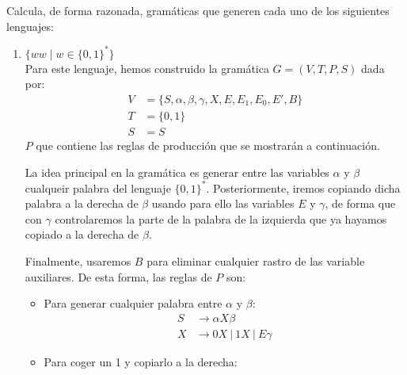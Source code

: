 \begin{ejercicio}
    Calcula, de forma razonada, gramáticas que generen cada uno de los siguientes lenguajes:
    \begin{enumerate}
        \item $\{ww \mid w \in \{0,1\}^\ast\}$\\
            Para este lenguaje, hemos construido la gramática $G=(V,T,P,S)$ dada por:
            \begin{align*}
                V &= \{S, \alpha, \beta, \gamma, X, E, E_1, E_0, E', B\} \\
                T &= \{0,1\} \\
                S &= S
            \end{align*}
            $P$ que contiene las reglas de producción que se mostrarán a continuación. 

            La idea principal en la gramática es generar entre las variables $\alpha$ y $\beta$ cualqueir palabra del lenguaje ${\{0,1\}}^{\ast}$. Posteriormente, iremos copiando dicha palabra a la derecha de $\beta$ usando para ello las variables $E$ y $\gamma$, de forma que con $\gamma$ controlaremos la parte de la palabra de la izquierda que ya hayamos copiado a la derecha de $\beta$.

            Finalmente, usaremos $B$ para eliminar cualquier rastro de las variable auxiliares. De esta forma, las reglas de $P$ son:
            \begin{itemize}
                \item Para generar cualquier palabra entre $\alpha$ y $\beta$:
                    \begin{align*}
                        S &\rightarrow \alpha X \beta \\
                        X &\rightarrow 0X\ |\ 1X\ |\ E\gamma
                    \end{align*}
                \item Para coger un 1 y copiarlo a la derecha:


\end{itemize}
\end{enumerate}
\end{ejercicio}
